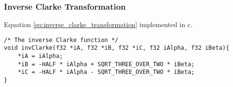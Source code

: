 \subsubsection{Inverse Clarke Transformation}
\label{app:inverse_clarke}
Equation \ref{eq:inverse_clarke_transformation} implemented in c.

\begin{lstlisting}[style=c, caption=Embedded Inverse Clarke Transformation., label=app:code:inverse_clarke]
/* The inverse Clarke function */
void invClarke(f32 *iA, f32 *iB, f32 *iC, f32 iAlpha, f32 iBeta){
	*iA = iAlpha;
	*iB = -HALF * iAlpha + SQRT_THREE_OVER_TWO * iBeta;
	*iC = -HALF * iAlpha - SQRT_THREE_OVER_TWO * iBeta;
}
\end{lstlisting}